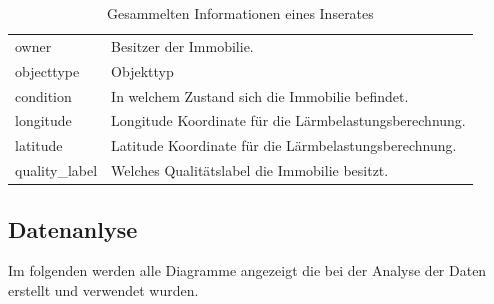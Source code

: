 \begin{table}[ht]
{\begin{tabular}{@{}ll@{}}
  owner  & Besitzer der Immobilie.\\
  objecttype & Objekttyp\\
  condition & In welchem Zustand sich die Immobilie befindet.\\
  longitude & Longitude Koordinate für die Lärmbelastungsberechnung.\\
  latitude & Latitude Koordinate für die Lärmbelastungsberechnung.\\
  quality\_label & Welches Qualitätslabel die Immobilie besitzt.\\
  \bottomrule
\end{tabular}}
\caption{Gesammelten Informationen eines Inserates}
\label{tab:crawled_info}
\end{table}

\subsection{Datenanlyse}
\label{daten_analys}
Im folgenden werden alle Diagramme angezeigt die bei der Analyse der Daten erstellt und verwendet wurden.

